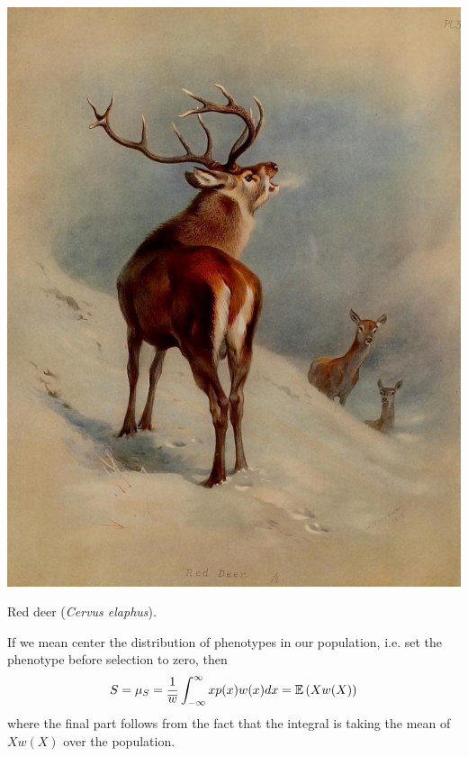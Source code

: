 \begin{marginfigure}
  \begin{center}
    \includegraphics[width= \textwidth]{illustration_images/Quant_gen/red_deer/Red_deer.png}
\end{center}
\caption{Red deer ({\it Cervus elaphus}). } \label{fig:red_deer}  
\end{marginfigure}

If we mean center the distribution of phenotypes in our population, i.e. set the phenotype before
selection to zero, then
\begin{equation}
S=\mu_S= \frac{1}{\overline{w}}\int_{-\infty}^{\infty} x p(x) w(x) dx = \mathbb{E} \left (X
  w(X) \right)
\end{equation}
where the final part follows from the fact that the integral is taking
the mean of $X w(X)$ over the population.

